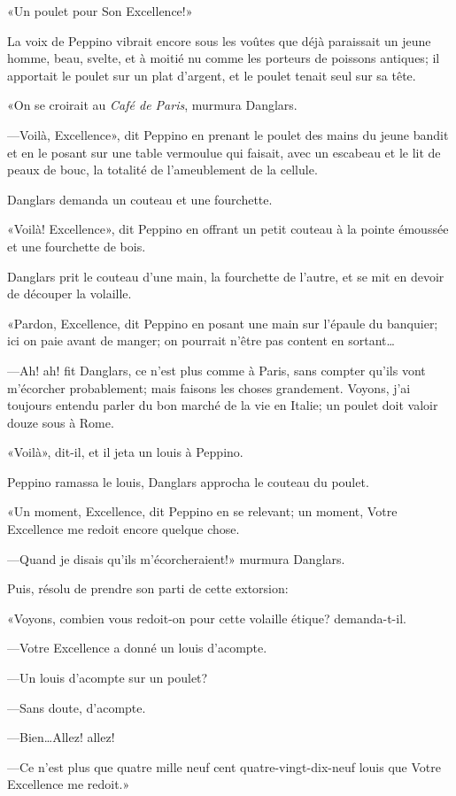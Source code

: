 «Un poulet pour Son Excellence!» 

La voix de Peppino vibrait encore sous les voûtes que déjà paraissait un jeune homme, beau, svelte, et à moitié nu comme les porteurs de poissons antiques; il apportait le poulet sur un plat d'argent, et le poulet tenait seul sur sa tête. 

«On se croirait au \textit{Café de Paris}, murmura Danglars. 

—Voilà, Excellence», dit Peppino en prenant le poulet des mains du jeune bandit et en le posant sur une table vermoulue qui faisait, avec un escabeau et le lit de peaux de bouc, la totalité de l'ameublement de la cellule. 

Danglars demanda un couteau et une fourchette. 

«Voilà! Excellence», dit Peppino en offrant un petit couteau à la pointe émoussée et une fourchette de bois. 

Danglars prit le couteau d'une main, la fourchette de l'autre, et se mit en devoir de découper la volaille. 

«Pardon, Excellence, dit Peppino en posant une main sur l'épaule du banquier; ici on paie avant de manger; on pourrait n'être pas content en sortant\dots 

—Ah! ah! fit Danglars, ce n'est plus comme à Paris, sans compter qu'ils vont m'écorcher probablement; mais faisons les choses grandement. Voyons, j'ai toujours entendu parler du bon marché de la vie en Italie; un poulet doit valoir douze sous à Rome. 

«Voilà», dit-il, et il jeta un louis à Peppino. 

Peppino ramassa le louis, Danglars approcha le couteau du poulet. 

«Un moment, Excellence, dit Peppino en se relevant; un moment, Votre Excellence me redoit encore quelque chose. 

—Quand je disais qu'ils m'écorcheraient!» murmura Danglars. 

Puis, résolu de prendre son parti de cette extorsion: 

«Voyons, combien vous redoit-on pour cette volaille étique? demanda-t-il. 

—Votre Excellence a donné un louis d'acompte. 

—Un louis d'acompte sur un poulet? 

—Sans doute, d'acompte. 

—Bien\dots Allez! allez! 

—Ce n'est plus que quatre mille neuf cent quatre-vingt-dix-neuf louis que Votre Excellence me redoit.» 

